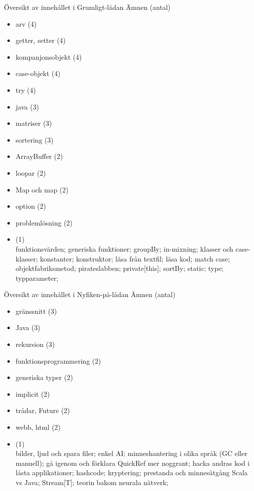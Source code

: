 

\ifkompendium\else

\begin{Slide}{Översikt av innehållet i Grumligt-lådan}\SlideFontSmall
Ämnen (antal)
\begin{multicols}{2}
\begin{itemize}\SlideFontTiny
\item arv (4)
\item getter, setter (4)
\item kompanjonsobjekt (4)
\item case-objekt (4)
\item try (4)
\item java (3)
\item matriser (3)
\item sortering (3)
\item ArrayBuffer (2)
\item loopar (2)
\item Map och map (2)
\item option (2)
\item problemlösning (2)
\item (1) \\
funktionsvärden; 
generiska funktioner;
groupBy;
in-mixning;
klasser och case-klasser;
konstanter;
konstruktor;
läsa från textfil;
läsa kod;
match case;
objektfabriksmetod;
pirateslabben;
private[this];
sortBy;
static;
type;
typparameter;

\end{itemize}
\end{multicols}
\end{Slide}

\begin{Slide}{Översikt av innehållet i Nyfiken-på-lådan}\SlideFontSmall
Ämnen (antal)
\begin{multicols}{2}
\begin{itemize}\SlideFontTiny
\item gränssnitt (3)
\item Java (3)
\item rekursion (3)
\item funktionsprogrammering (2)
\item generiska typer (2)
\item implicit (2)
\item trådar, Future (2)
\item webb, html (2)
\item (1) \\
bilder, ljud och spara filer; 
enkel AI; 
minneshantering i olika språk (GC eller manuell);
gå igenom och förklara QuickRef mer noggrant;
hacka andras kod i låsta applikationer;
hashcode;
kryptering;
prestanda och minnesåtgång Scala vs Java;
Stream[T];
teorin bakom neurala nätverk;
\end{itemize}
\end{multicols}
\end{Slide}

